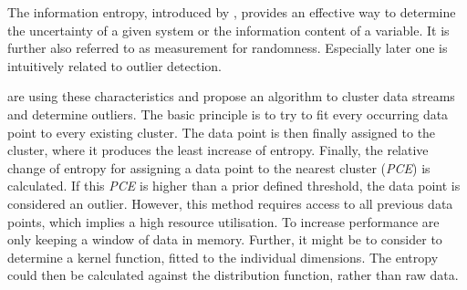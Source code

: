The information entropy, introduced by \textcite{Shannon1948}, provides an effective way to determine the uncertainty of a given system or the information content of a variable. It is further also referred to as measurement for randomness. Especially later one is intuitively related to outlier detection.

\textcite{Toshniwal2014} are using these characteristics and propose an algorithm to cluster data streams and determine outliers. 
The basic principle is to try to fit every occurring data point to every existing cluster. The data point is then finally assigned to the cluster, where it produces the least increase of entropy. Finally, the relative change of entropy for assigning a data point to the nearest cluster (\emph{PCE}) is calculated. If this \emph{PCE} is higher than a prior defined threshold, the data point is considered an outlier.
However, this method requires access to all previous data points, which implies a high resource utilisation. To increase performance \textcite{Toshniwal2014} are only keeping a window of data in memory.
Further, it might be to consider to determine a kernel function, fitted to the individual dimensions. The entropy could then be calculated against the distribution function, rather than raw data.

